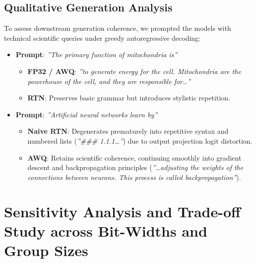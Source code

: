 \documentclass[conference]{IEEEtran}
\begin{document}
\subsection{Qualitative Generation Analysis}
To assess downstream generation coherence, we prompted the models with technical scientific queries under greedy autoregressive decoding:
\begin{itemize}
    \item \textbf{Prompt}: \textit{''The primary function of mitochondria is''}
    \begin{itemize}
        \item \textbf{FP32 / AWQ}: \textit{''to generate energy for the cell. Mitochondria are the powerhouse of the cell, and they are responsible for\dots''}
        \item \textbf{RTN}: Preserves basic grammar but introduces stylistic repetition.
    \end{itemize}
    \item \textbf{Prompt}: \textit{''Artificial neural networks learn by''}
    \begin{itemize}
        \item \textbf{Naive RTN}: Degenerates prematurely into repetitive syntax and numbered lists (\textit{''\#\#\# 1.1.1\dots''}) due to output projection logit distortion.
        \item \textbf{AWQ}: Retains scientific coherence, continuing smoothly into gradient descent and backpropagation principles (\textit{''\dots adjusting the weights of the connections between neurons. This process is called backpropagation''}).
    \end{itemize}
\end{itemize}

\section{Sensitivity Analysis and Trade-off Study across Bit-Widths and Group Sizes}
\label{sec:sensitivity}
\end{document}
